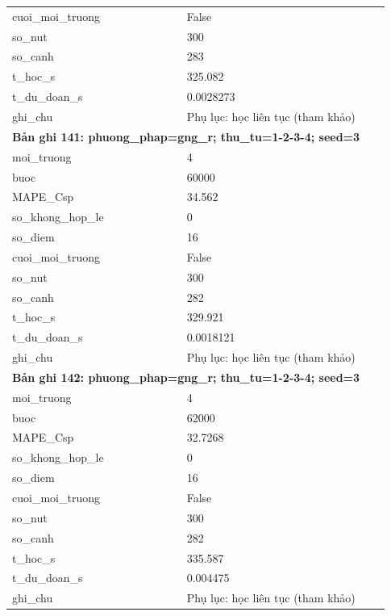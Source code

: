 \begin{longtable}{p{0.43\linewidth}p{0.50\linewidth}}
cuoi\_\allowbreak moi\_\allowbreak truong & False \\
so\_\allowbreak nut & 300 \\
so\_\allowbreak canh & 283 \\
t\_\allowbreak hoc\_\allowbreak s & 325.082 \\
t\_\allowbreak du\_\allowbreak doan\_\allowbreak s & 0.0028273 \\
ghi\_\allowbreak chu & Phụ lục: học liên tục (tham khảo) \\
\midrule
\multicolumn{2}{p{0.95\linewidth}}{\textbf{Bản ghi 141: phuong\_phap=gng\_r; thu\_tu=1-2-3-4; seed=3}} \\
moi\_\allowbreak truong & 4 \\
buoc & 60000 \\
MAPE\_\allowbreak Csp & 34.562 \\
so\_\allowbreak khong\_\allowbreak hop\_\allowbreak le & 0 \\
so\_\allowbreak diem & 16 \\
cuoi\_\allowbreak moi\_\allowbreak truong & False \\
so\_\allowbreak nut & 300 \\
so\_\allowbreak canh & 282 \\
t\_\allowbreak hoc\_\allowbreak s & 329.921 \\
t\_\allowbreak du\_\allowbreak doan\_\allowbreak s & 0.0018121 \\
ghi\_\allowbreak chu & Phụ lục: học liên tục (tham khảo) \\
\midrule
\multicolumn{2}{p{0.95\linewidth}}{\textbf{Bản ghi 142: phuong\_phap=gng\_r; thu\_tu=1-2-3-4; seed=3}} \\
moi\_\allowbreak truong & 4 \\
buoc & 62000 \\
MAPE\_\allowbreak Csp & 32.7268 \\
so\_\allowbreak khong\_\allowbreak hop\_\allowbreak le & 0 \\
so\_\allowbreak diem & 16 \\
cuoi\_\allowbreak moi\_\allowbreak truong & False \\
so\_\allowbreak nut & 300 \\
so\_\allowbreak canh & 282 \\
t\_\allowbreak hoc\_\allowbreak s & 335.587 \\
t\_\allowbreak du\_\allowbreak doan\_\allowbreak s & 0.004475 \\
ghi\_\allowbreak chu & Phụ lục: học liên tục (tham khảo) \\

\end{longtable}

